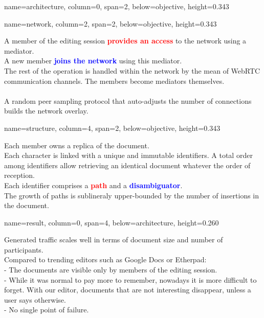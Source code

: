\documentclass[a1paper, fontscale=0.4, portrait]{baposter}
\newcommand{\RED}[1]{\textcolor{red}{\textbf{#1}}}
\newcommand{\BLUE}[1]{\textcolor{blue}{\textbf{#1}}}
\newcommand{\SECONDROW}{0.343}
\newcommand{\THIRDROW}{0.260}
\begin{document}
\begin{poster}
  {name=architecture, column=0, span=2, below=objective, height=\SECONDROW}{
    \begin{center}
      
    \end{center}
  }
  
  {name=network, column=2, span=2, below=objective, height=\SECONDROW}{
    \begin{center}
            
    \end{center}
    A member of the editing session \RED{provides an access} to the network using
    a mediator. \\
    A new member \BLUE{joins the network} using this mediator. \\
    The rest of the operation is handled within the network by the mean of
    WebRTC communication channels. The members become mediators themselves.\\
    \\
    A random peer sampling protocol that auto-adjusts the number of connections
    builds the network overlay.

  }

  {name=structure, column=4, span=2, below=objective, height=\SECONDROW}{
    \begin{center}
      
    \end{center}
    Each member owns a replica of the document.\\
    Each character is linked with a unique and immutable identifiers. A total
    order among identifiers allow retrieving an identical document whatever the
    order of reception.\\
    Each identifier comprises a \RED{path} and a \BLUE{disambiguator}. \\
    The growth of paths is sublineraly upper-bounded by the number of insertions in
    the document.   
}

  {name=result, column=0, span=4, below=architecture, height=\THIRDROW}{
    \begin{minipage}[c]{.5\linewidth}
      Generated traffic scales well in terms of document size and number of
      participants.\\
                  
      Compared to trending editors such as Google Docs or Etherpad:\\
      - The documents are visible only by members of the editing session.\\
      - While it was normal to pay more to remember, nowadays it is more
      difficult to forget. With our editor, documents that are not interesting
      disappear,
      unless a user says otherwise.\\
      - No single point of failure. \\
     

\end{minipage}}
\end{poster}
\end{document}
